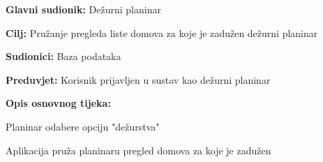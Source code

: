 				
			\noindent {}
				\begin{packed_item}
					
					\item \textbf{Glavni sudionik: }$ $Dežurni planinar$ $
					\item  \textbf{Cilj:} $ $Pružanje pregleda liste domova za koje je zadužen dežurni planinar$ $
					\item  \textbf{Sudionici:} $ $Baza podataka$ $
					\item  \textbf{Preduvjet:} $ $Korisnik prijavljen u sustav kao dežurni planinar $ $
					\item  \textbf{Opis osnovnog tijeka:}
					
					\item[] \begin{packed_enum}
						
						\item $ $Planinar odabere opciju "dežurstva"$ $
						\item $ $Aplikacija pruža planinaru pregled domova za koje je zadužen$ $
				\end{packed_enum}
			\end{packed_item}
		
